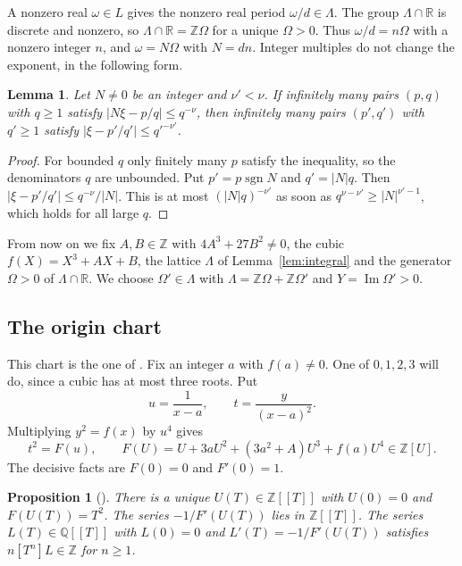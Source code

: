 \documentclass[11pt]{amsart}
\newtheorem{lemma}[theorem]{Lemma}
\newtheorem{proposition}[theorem]{Proposition}
\theoremstyle{definition}
\theoremstyle{remark}
\numberwithin{equation}{section}
\newcommand{\Z}{\mathbb Z}
\newcommand{\Q}{\mathbb Q}
\newcommand{\R}{\mathbb R}
\newcommand{\CM}{\cite{ChudnovskyChudnovsky26}}
\begin{document}
A nonzero real $\omega\in L$ gives the nonzero real period $\omega/d\in\Lambda$. The group $\Lambda\cap\R$ is
discrete and nonzero, so $\Lambda\cap\R=\Z\Omega$ for a unique $\Omega>0$. Thus $\omega/d=n\Omega$ with a
nonzero integer $n$, and $\omega=N\Omega$ with $N=dn$. Integer multiples do not change the exponent, in the following form.

\begin{lemma}\label{lem:scale}
Let $N\ne0$ be an integer and $\nu'<\nu$. If infinitely many pairs $(p,q)$ with $q\ge1$ satisfy
$|N\xi-p/q|\le q^{-\nu}$, then infinitely many pairs $(p',q')$ with $q'\ge1$ satisfy
$|\xi-p'/q'|\le q'^{-\nu'}$.
\end{lemma}

\begin{proof}
For bounded $q$ only finitely many $p$ satisfy the inequality, so the denominators $q$ are unbounded. Put
$p'=p\operatorname{sgn}N$ and $q'=|N|q$. Then $|\xi-p'/q'|\le q^{-\nu}/|N|$. This is at most
$(|N|q)^{-\nu'}$ as soon as $q^{\nu-\nu'}\ge|N|^{\nu'-1}$, which holds for all large $q$.
\end{proof}

From now on we fix $A,B\in\Z$ with $4A^3+27B^2\ne0$, the cubic $f(X)=X^3+AX+B$, the lattice $\Lambda$ of
Lemma~\ref{lem:integral} and the generator $\Omega>0$ of $\Lambda\cap\R$. We choose $\Omega'\in\Lambda$ with
$\Lambda=\Z\Omega+\Z\Omega'$ and $Y=\operatorname{Im}\Omega'>0$.

\subsection{The origin chart}
This chart is the one of \CM. Fix an integer $a$ with $f(a)\ne0$. One of $0,1,2,3$ will do, since a cubic has at
most three roots. Put
\[
 u=\frac1{x-a},\qquad t=\frac y{(x-a)^2}.
\]
Multiplying $y^2=f(x)$ by $u^4$ gives
\begin{equation}\label{eq:quartic}
 t^2=F(u),\qquad F(U)=U+3aU^2+(3a^2+A)U^3+f(a)U^4\in\Z[U].
\end{equation}
The decisive facts are $F(0)=0$ and $F'(0)=1$.

\begin{proposition}[{\cite[Proposition~3.1]{ChudnovskyChudnovsky26}}]\label{prop:chart}
There is a unique $U(T)\in\Z[[T]]$ with $U(0)=0$ and $F(U(T))=T^2$. The series $-1/F'(U(T))$ lies in $\Z[[T]]$.
The series $L(T)\in\Q[[T]]$ with $L(0)=0$ and $L'(T)=-1/F'(U(T))$ satisfies $n[T^n]L\in\Z$ for $n\ge1$.
\end{proposition}
\end{document}
